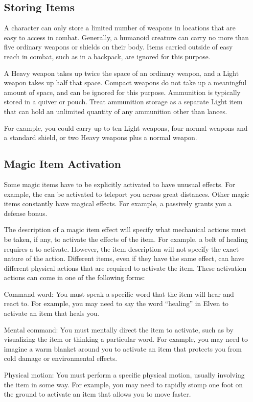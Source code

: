   \subsection{Storing Items}\label{Storing Items}
    A character can only store a limited number of weapons in locations that are easy to access in combat.
    Generally, a humanoid creature can carry no more than five ordinary weapons or shields on their body.
    Items carried outside of easy reach in combat, such as in a backpack, are ignored for this purpose.

    A Heavy weapon takes up twice the space of an ordinary weapon, and a Light weapon takes up half that space.
    Compact weapons do not take up a meaningful amount of space, and can be ignored for this purpose.
    Ammunition is typically stored in a quiver or pouch.
    Treat ammunition storage as a separate Light item that can hold an unlimited quantity of any ammunition other than lances.

    For example, you could carry up to ten Light weapons, four normal weapons and a standard shield, or two Heavy weapons plus a normal weapon.

  \subsection{Magic Item Activation}

    Some magic items have to be explicitly activated to have unusual effects.
    For example, the  can be activated to teleport you across great distances.
    Other magic items constantly have magical effects.
    For example, a  passively grants you a defense bonus.

    The description of a magic item effect will specify what mechanical actions must be taken, if any, to activate the effects of the item.
    For example, a belt of healing requires a  to activate.
    However, the item description will not specify the exact nature of the action.
    Different items, even if they have the same effect, can have different physical actions that are required to activate the item.
    These activation actions can come in one of the following forms:
    \begin{raggeditemize}
      \item Command word: You must speak a specific word that the item will hear and react to.
        For example, you may need to say the word ``healing'' in Elven to activate an item that heals you.
      \item Mental command: You must mentally direct the item to activate, such as by visualizing the item or thinking a particular word.
        For example, you may need to imagine a warm blanket around you to activate an item that protects you from cold damage or environmental effects.
      \item Physical motion: You must perform a specific physical motion, usually involving the item in some way.
        For example, you may need to rapidly stomp one foot on the ground to activate an item that allows you to move faster.
    \end{raggeditemize}

